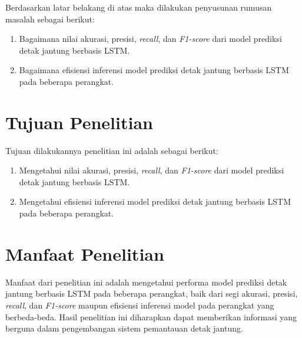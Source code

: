 Berdasarkan latar belakang di atas maka dilakukan penyusunan rumusan masalah sebagai berikut:

\begin{enumerate}
  \item Bagaimana nilai akurasi, presisi, \emph{recall}, dan \emph{F1-score} dari model prediksi detak jantung berbasis LSTM.
  \item Bagaimana efisiensi inferensi model prediksi detak jantung berbasis LSTM pada beberapa perangkat.
\end{enumerate}


\section{Tujuan Penelitian}
Tujuan dilakukannya penelitian ini adalah sebagai berikut:

\begin{enumerate}
  \item Mengetahui nilai akurasi, presisi, \emph{recall}, dan \emph{F1-score} dari model prediksi detak jantung berbasis LSTM.
  \item Mengetahui efisiensi inferensi model prediksi detak jantung berbasis LSTM pada beberapa perangkat.
\end{enumerate}


\section{Manfaat Penelitian}

Manfaat dari penelitian ini adalah mengetahui performa model prediksi detak jantung berbasis LSTM pada beberapa perangkat, baik dari segi akurasi, presisi, \emph{recall}, dan \emph{F1-score} maupun efisiensi inferensi model pada perangkat yang berbeda-beda. Hasil penelitian ini diharapkan dapat memberikan informasi yang berguna dalam pengembangan sistem pemantauan detak jantung.


